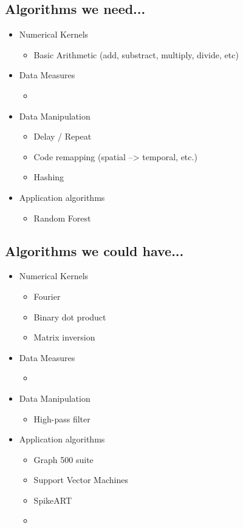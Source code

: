 \documentclass{article}
\begin{document}
\subsection{Algorithms we need...}
\begin{itemize}
	\item Numerical Kernels
	\begin{itemize}
		\item Basic Arithmetic (add, substract, multiply, divide, etc)
	\end{itemize}
	\item Data Measures
	\begin{itemize}
		\item
	\end{itemize}
	\item Data Manipulation
	\begin{itemize}
		\item Delay / Repeat
		\item Code remapping (spatial --> temporal, etc.)
		\item Hashing
	\end{itemize}
	\item Application algorithms
	\begin{itemize}
		\item Random Forest
	\end{itemize}

\end{itemize}

\subsection{Algorithms we could have...}
\begin{itemize}
	\item Numerical Kernels
	\begin{itemize}
		\item Fourier
		\item Binary dot product
		\item Matrix inversion
	\end{itemize}
	\item Data Measures
	\begin{itemize}
		\item
	\end{itemize}
	\item Data Manipulation
	\begin{itemize}
		\item High-pass filter
	\end{itemize}
	\item Application algorithms
	\begin{itemize}
		\item Graph 500 suite
		\item Support Vector Machines
		\item SpikeART
		\item 
	\end{itemize}

\end{itemize}
\end{document}
